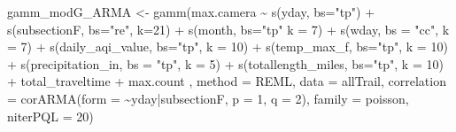 \documentclass[
]{book}
\newenvironment{Shaded}{\begin{snugshade}}{\end{snugshade}}
\newcommand{\AttributeTok}[1]{\textcolor[rgb]{0.77,0.63,0.00}{#1}}
\newcommand{\DecValTok}[1]{\textcolor[rgb]{0.00,0.00,0.81}{#1}}
\newcommand{\FunctionTok}[1]{\textcolor[rgb]{0.00,0.00,0.00}{#1}}
\newcommand{\NormalTok}[1]{#1}
\newcommand{\OtherTok}[1]{\textcolor[rgb]{0.56,0.35,0.01}{#1}}
\newcommand{\SpecialCharTok}[1]{\textcolor[rgb]{0.00,0.00,0.00}{#1}}
\newcommand{\StringTok}[1]{\textcolor[rgb]{0.31,0.60,0.02}{#1}}
\begin{document}
\begin{Shaded}
\begin{Highlighting}[]
\NormalTok{gamm\_modG\_ARMA }\OtherTok{\textless{}{-}} \FunctionTok{gamm}\NormalTok{(max.camera }\SpecialCharTok{\textasciitilde{}}
                         \FunctionTok{s}\NormalTok{(yday, }\AttributeTok{bs=}\StringTok{"tp"}\NormalTok{) }\SpecialCharTok{+}
                         \FunctionTok{s}\NormalTok{(subsectionF, }\AttributeTok{bs=}\StringTok{"re"}\NormalTok{, }\AttributeTok{k=}\DecValTok{21}\NormalTok{) }\SpecialCharTok{+}
                         \FunctionTok{s}\NormalTok{(month, }\AttributeTok{bs=}\StringTok{"tp"} \AttributeTok{k =} \DecValTok{7}\NormalTok{) }\SpecialCharTok{+}
                         \FunctionTok{s}\NormalTok{(wday, }\AttributeTok{bs =} \StringTok{"cc"}\NormalTok{, }\AttributeTok{k =} \DecValTok{7}\NormalTok{) }\SpecialCharTok{+}
                         \FunctionTok{s}\NormalTok{(daily\_aqi\_value, }\AttributeTok{bs=}\StringTok{"tp"}\NormalTok{, }\AttributeTok{k =} \DecValTok{10}\NormalTok{) }\SpecialCharTok{+}
                         \FunctionTok{s}\NormalTok{(temp\_max\_f, }\AttributeTok{bs=}\StringTok{"tp"}\NormalTok{, }\AttributeTok{k =} \DecValTok{10}\NormalTok{) }\SpecialCharTok{+}
                         \FunctionTok{s}\NormalTok{(precipitation\_in, }\AttributeTok{bs =} \StringTok{"tp"}\NormalTok{, }\AttributeTok{k =} \DecValTok{5}\NormalTok{) }\SpecialCharTok{+}
                        \FunctionTok{s}\NormalTok{(totallength\_miles,  }\AttributeTok{bs=}\StringTok{"tp"}\NormalTok{, }\AttributeTok{k =} \DecValTok{10}\NormalTok{) }\SpecialCharTok{+} 
\NormalTok{                        total\_traveltime }\SpecialCharTok{+}
\NormalTok{                         max.count}
\NormalTok{                        ,}
                      \AttributeTok{method =} \StringTok{\textquotesingle{}REML\textquotesingle{}}\NormalTok{,}
                       \AttributeTok{data =}\NormalTok{ allTrail, }
                      \AttributeTok{correlation =} \FunctionTok{corARMA}\NormalTok{(}\AttributeTok{form =} \SpecialCharTok{\textasciitilde{}}\NormalTok{yday}\SpecialCharTok{|}\NormalTok{subsectionF,}
                                            \AttributeTok{p =} \DecValTok{1}\NormalTok{, }\AttributeTok{q =} \DecValTok{2}\NormalTok{),}
                      \AttributeTok{family =}\NormalTok{ poisson, }
                      \AttributeTok{niterPQL =} \DecValTok{20}\NormalTok{)}
\end{Highlighting}
\end{Shaded}
\end{document}
